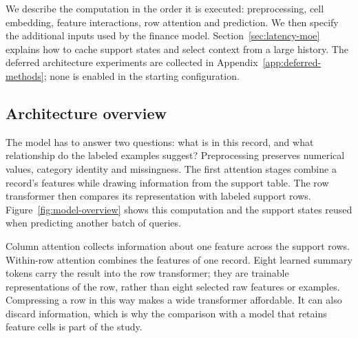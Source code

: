 \documentclass[11pt]{article}
\begin{document}
We describe the computation in the order it is executed: preprocessing, cell embedding, feature interactions, row attention and prediction. We then specify the additional inputs used by the finance model. Section~\ref{sec:latency-moe} explains how to cache support states and select context from a large history. The deferred architecture experiments are collected in Appendix~\ref{app:deferred-methods}; none is enabled in the starting configuration.


\subsection{Architecture overview}
\label{sec:model-overview}

The model has to answer two questions: what is in this record, and what relationship do the labeled examples suggest? Preprocessing preserves numerical values, category identity and missingness. The first attention stages combine a record's features while drawing information from the support table. The row transformer then compares its representation with labeled support rows. Figure~\ref{fig:model-overview} shows this computation and the support states reused when predicting another batch of queries.

Column attention collects information about one feature across the support rows. Within-row attention combines the features of one record. Eight learned summary tokens carry the result into the row transformer; they are trainable representations of the row, rather than eight selected raw features or examples. Compressing a row in this way makes a wide transformer affordable. It can also discard information, which is why the comparison with a model that retains feature cells is part of the study.
\end{document}
